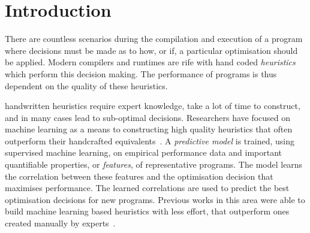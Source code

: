 \section{Introduction}

%
%
%

There are countless scenarios during the compilation and execution of a program where decisions must be made as to how, or if, a particular optimisation should be applied. Modern compilers and runtimes are rife with hand coded \emph{heuristics} which perform this decision making. The performance of programs is thus dependent on the quality of these heuristics.

handwritten heuristics require expert knowledge, take a lot of time to construct, and in many cases lead to sub-optimal decisions. Researchers have focused on machine learning as a means to constructing high quality heuristics that often outperform their handcrafted equivalents~\cite{Micolet2016,Falch2015,Stephenson2005,Agakov,Cummins2015a}. A \emph{predictive model} is trained, using supervised machine learning, on empirical performance data and important quantifiable properties, or \emph{features}, of representative programs. The model learns the correlation between these features and the optimisation decision that maximises performance. The learned correlations are used to predict the best optimisation decisions for new programs. Previous works in this area were able to build machine learning based heuristics with less effort, that outperform ones created manually by experts~\cite{Grewe2013,Magni2014}.

